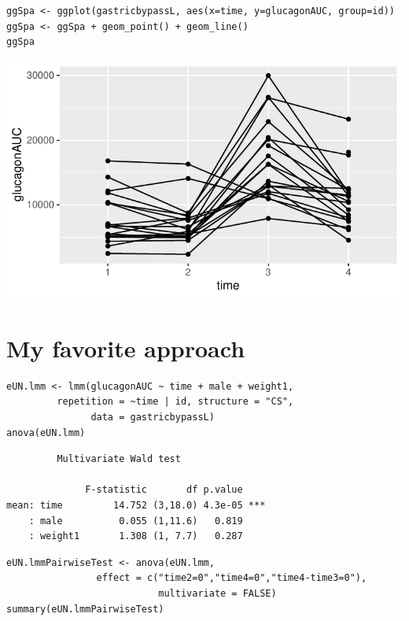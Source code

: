 \documentclass[12pt]{article}
\begin{document}
\lstset{language=r,label= ,caption= ,captionpos=b,numbers=none}
\begin{lstlisting}
ggSpa <- ggplot(gastricbypassL, aes(x=time, y=glucagonAUC, group=id))
ggSpa <- ggSpa + geom_point() + geom_line()
ggSpa
\end{lstlisting}

\begin{center}
\includegraphics[trim={0 0 0 0},width=1\textwidth]{./figures/gg-spaghettiplot.pdf}
\end{center}

\clearpage

\section{My favorite approach}
\label{sec:org5c04546}

\lstset{language=r,label= ,caption= ,captionpos=b,numbers=none}
\begin{lstlisting}
eUN.lmm <- lmm(glucagonAUC ~ time + male + weight1,
         repetition = ~time | id, structure = "CS",
               data = gastricbypassL)
anova(eUN.lmm) 
\end{lstlisting}

\begin{verbatim}
	     Multivariate Wald test 

              F-statistic       df p.value    
mean: time         14.752 (3,18.0) 4.3e-05 ***
    : male          0.055 (1,11.6)   0.819    
    : weight1       1.308 (1, 7.7)   0.287
\end{verbatim}


\lstset{language=r,label= ,caption= ,captionpos=b,numbers=none}
\begin{lstlisting}
eUN.lmmPairwiseTest <- anova(eUN.lmm,
                effect = c("time2=0","time4=0","time4-time3=0"),
                           multivariate = FALSE)
summary(eUN.lmmPairwiseTest)
\end{lstlisting}
\end{document}
